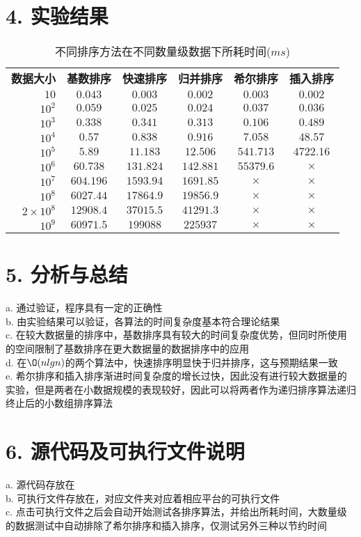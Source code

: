 \documentclass[12pt]{article}
\begin{document}
  \section*{4. 实验结果}
    \begin{table}[h!]
      \begin{center}
        \caption{不同排序方法在不同数量级数据下所耗时间($ms$)}
        \begin{tabular}{r|c|c|c|c|c}
          \toprule
          \textbf{数据大小} & \textbf{基数排序} & \textbf{快速排序} & \textbf{归并排序} & \textbf{希尔排序} & \textbf{插入排序}\\
          $10$ & $0.043$ & $0.003$ & $0.002$ & $0.003$ & $0.002$\\
          $10^2$ & $0.059$ & $0.025$ & $0.024$ & $0.037$ & $0.036$\\
          $10^3$ & $0.338$ & $0.341$ & $0.313$ & $0.106$ & $0.489$\\
          $10^4$ & $0.57$ & $0.838$ & $0.916$ & $7.058$ & $48.57$\\
          $10^5$ & $5.89$ & $11.183$ & $12.506$ & $541.713$ & $4722.16$\\
          $10^6$ & $60.738$ & $131.824$ & $142.881$ & $55379.6$ & $\times$\\
          $10^7$ & $604.196$ & $1593.94$ & $1691.85$ & $\times$ & $\times$\\
          $10^8$ & $6027.44$ & $17864.9$ & $19856.9$ & $\times$ & $\times$\\
          $2\times10^8$ & $12908.4$ & $37015.5$ & $41291.3$ & $\times$ & $\times$\\
          $10^9$ & $60971.5$ & $199088$ & $225937$ & $\times$ & $\times$\\
          \midrule
          \bottomrule
        \end{tabular}
      \end{center}
    \end{table}
  \section*{5. 分析与总结}
  a. 通过验证，程序具有一定的正确性\\
  b. 由实验结果可以验证，各算法的时间复杂度基本符合理论结果\\
  c. 在较大数据量的排序中，基数排序具有较大的时间复杂度优势，但同时所使用的空间限制了基数排序在更大数据量的数据排序中的应用\\
  d. 在$\O(nlgn)$的两个算法中，快速排序明显快于归并排序，这与预期结果一致\\
  e. 希尔排序和插入排序渐进时间复杂度的增长过快，因此没有进行较大数据量的实验，但是两者在小数据规模的表现较好，因此可以将两者作为递归排序算法递归终止后的小数组排序算法
  \section*{6. 源代码及可执行文件说明}
  a. 源代码存放在\\
  b. 可执行文件存放在，对应文件夹对应着相应平台的可执行文件\\
  c. 点击可执行文件之后会自动开始测试各排序算法，并给出所耗时间，大数量级的数据测试中自动排除了希尔排序和插入排序，仅测试另外三种以节约时间\\
\end{document}

